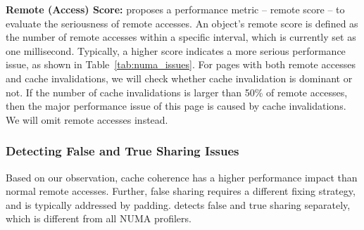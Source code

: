 \textbf{Remote (Access) Score:} \NP{}  proposes a performance metric -- remote score -- to evaluate the seriousness of remote accesses. An object's remote score is defined as the number of remote accesses within a specific interval, which is currently set as one millisecond. Typically, a higher score indicates a more serious performance issue, as shown in Table~\ref{tab:numa_issues}. 
For pages with both remote accesses and cache invalidations, we will check whether cache invalidation is dominant or not. If the number of cache invalidations is larger than 50\% of remote accesses, then the major performance issue of this page is caused by cache invalidations. We will omit remote accesses instead. 
 


   



\subsubsection{Detecting False and True Sharing Issues}
\label{sec: cacheline}

Based on our observation,  cache coherence has a higher performance impact than normal remote accesses. Further, false sharing requires a different fixing strategy, and is typically addressed by padding. 
\NP{} detects false and true sharing separately, which is different from all NUMA profilers. 


